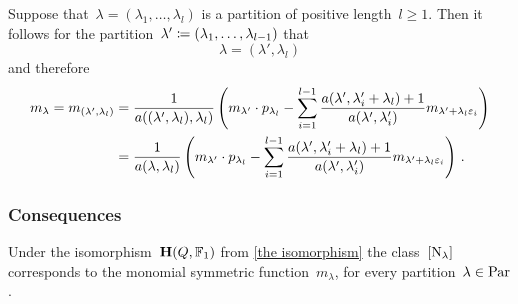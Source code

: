 \documentclass[a4paper,11pt]{scrartcl}
\begin{document}
Suppose that~$\lambda = (\lambda_1, \dotsc, \lambda_l)$ is a partition of positive length~$l \geq 1$.
Then it follows for the partition~$\lambda' \coloneqq (\lambda_1, \dotsc, \lambda_{l-1})$ that
\[
  \lambda = (\lambda', \lambda_l)
\]
and therefore
\begin{align}
  m_\lambda
  =
  m_{(\lambda', \lambda_l)}
  &=
  \frac{1}{a((\lambda', \lambda_l), \lambda_l)}
  \left(
    m_{\lambda'} \cdot p_{\lambda_l}
    -
    \sum_{i=1}^{l-1}
    \frac{ a(\lambda', \lambda'_i + \lambda_l) + 1 }{ a(\lambda', \lambda'_i) } 
    m_{\lambda' + \lambda_l \varepsilon_i}
  \right)
  \notag
  \\
  &=
  \frac{1}{a(\lambda, \lambda_l)}
  \left(
    m_{\lambda'} \cdot p_{\lambda_l}
    -
    \sum_{i=1}^{l-1}
    \frac{ a(\lambda', \lambda'_i + \lambda_l) + 1 }{ a(\lambda', \lambda'_i) } 
    m_{\lambda' + \lambda_l \varepsilon_i}
  \right) \,.
  \label{identity for polynomials}
\end{align}

\subsubsection{Consequences}

\begin{proposition}
  Under the isomorphism~$\mathbf{H}(Q, \mathbb{F}_1)$ from \cref{the isomorphism} the class~$[ \mathrm{N}_\lambda ]$ corresponds to the monomial symmetric function~$m_\lambda$, for every partition~$\lambda \in \mathrm{Par}$.
\end{proposition}
\end{document}
